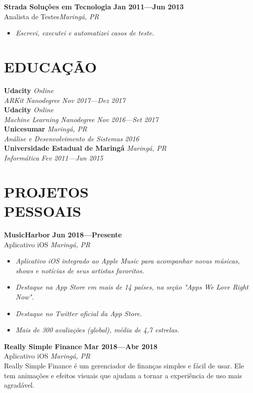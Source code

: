 \documentclass[line,margin]{res}
\begin{document}
\begin{resume}
  {\bf Strada Solu\c{c}\~oes em Tecnologia} \hfill {\bf Jan 2011---Jun 2013} \\
  Analista de Testes\hfill {\sl Maring\'a, PR}\\[-6pt]
    \begin{itemize}
    \item {\sl Escrevi, executei e automatizei casos de teste.}
  \end{itemize}


\section{EDUCAÇÃO}
  {\bf Udacity} \hfill {\sl Online} \\
  {\sl ARKit Nanodegree} \hfill {\sl Nov 2017---Dez 2017}\\[6pt]
  {\bf Udacity} \hfill {\sl Online} \\
  {\sl Machine Learning Nanodegree} \hfill {\sl Nov 2016---Set 2017}\\[6pt]
  {\bf Unicesumar} \hfill {\sl Maring\'a, PR} \\
  {\sl Análise e Desenvolvimento de Sistemas} \hfill {\sl 2016}\\[6pt]
  {\bf Universidade Estadual de Maringá} \hfill {\sl Maring\'a, PR} \\
  {\sl Informática} \hfill {\sl Fev 2011---Jun 2015}


\section{PROJETOS \\ PESSOAIS}
  {\bf MusicHarbor} \hfill {\bf Jun 2018---Presente} \\
  Aplicativo iOS \hfill {\sl Maring\'a, PR}\\[-6pt]
    \begin{itemize}
    \item {\sl Aplicativo iOS integrado ao Apple Music para acompanhar novas músicas, shows e notícias de seus artistas favoritos.}
    \item {\sl Destaque na App Store em mais de 14 países, na seção "Apps We Love Right Now".}
    \item {\sl Destaque no Twitter oficial da App Store.}
    \item {\sl Mais de 300 avaliações (global), média de 4,7 estrelas.}
    \end{itemize}
  
  {\bf Really Simple Finance} \hfill {\bf Mar 2018---Abr 2018} \\
  Aplicativo iOS \hfill {\sl Maring\'a, PR}\\[6pt]
  Really Simple Finance é um gerenciador de finanças simples e fácil de usar. Ele tem animações e efeitos visuais que ajudam a tornar a experiência de uso mais agradável.


\end{resume}
\end{document}
